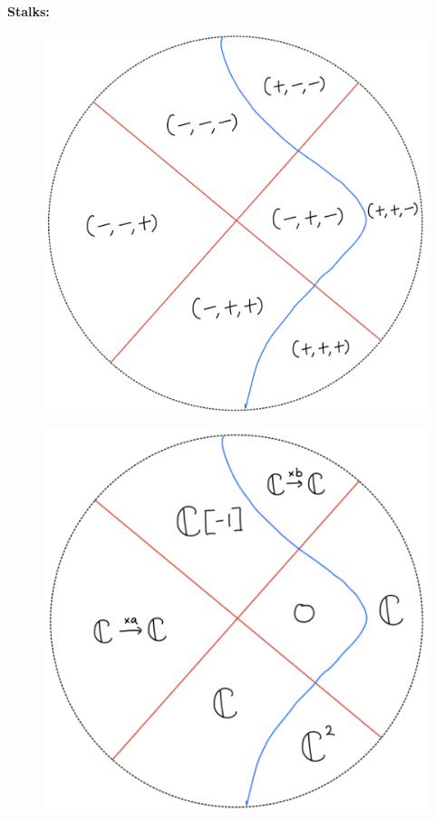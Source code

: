 \textbf{Stalks:}
\begin{figure}[H]
    \centering
    \includegraphics[scale = 0.45]{diagrams/lemma4/22.png}
    \caption{}
    \label{fig:your-label}
\end{figure}
\begin{figure}[H]
    \centering
    \includegraphics[scale = 0.45]{diagrams/lemma4/23.png}
    \caption{}
    \label{fig:your-label}
\end{figure}
